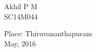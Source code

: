 \documentclass[a4paper, 12pt, oneside]{Thesis}  %
\begin{document}
\vspace*{0.5in}
\hspace*{4.5in} 
\parbox{2.9in}{
\noindent  Akhil P M \\
\noindent SC14M044 \\ 
}  

\vspace*{0.25in}

\noindent Place: Thiruvananthapuram\\
May, 2016




\fancyhead{}  %
\rhead{\thepage}  %
\lhead{}  %

\pagestyle{fancy}  %


\clearpage  %


\end{document}
